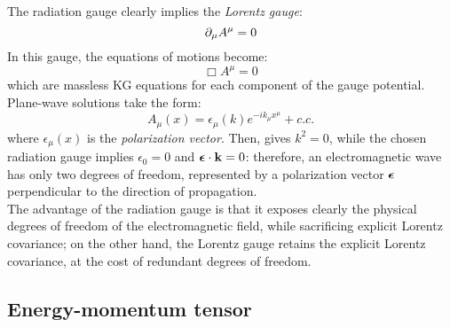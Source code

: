 The radiation gauge clearly implies the \textit{Lorentz gauge}:
\begin{equation}
  \partial_\mu A^\mu = 0
\end{equation}
In this gauge, the equations of motions  become:
\begin{equation}
  \Box A^\mu = 0
  \label{eq:maxw-lor}
\end{equation}
which are massless KG equations for each component of the gauge potential. Plane-wave solutions take the form:
\begin{equation}
  A_\mu(x) = \epsilon_\mu(k) e^{-i k_\mu x^\mu} + c.c.
\end{equation}
where $ \epsilon_\mu(x) $ is the \textit{polarization vector}. Then,  gives $ k^2 = 0 $, while the chosen radiation gauge implies $ \epsilon_0 = 0 $ and $ \boldsymbol{\epsilon} \cdot \mathbf{k} = 0 $: therefore, an electromagnetic wave has only two degrees of freedom, represented by a polarization vector $ \boldsymbol{\epsilon} $ perpendicular to the direction of propagation.\\
The advantage of the radiation gauge is that it exposes clearly the physical degrees of freedom of the electromagnetic field, while sacrificing explicit Lorentz covariance; on the other hand, the Lorentz gauge retains the explicit Lorentz covariance, at the cost of redundant degrees of freedom.

\subsection{Energy-momentum tensor}

